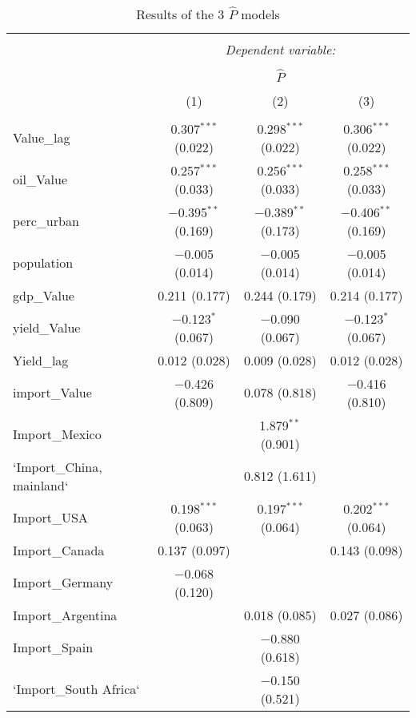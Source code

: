 
\begin{table}[H] \centering 
  \caption{Results of the 3 $\hat{P}$ models} 
  \label{table:table_phat} 
\tiny 
\begin{tabular}{@{\extracolsep{5pt}}lccc} 
\\[-1.8ex]\hline 
\hline \\[-1.8ex] 
 & \multicolumn{3}{c}{\textit{Dependent variable:}} \\ 
\cline{2-4} 
\\[-1.8ex] & \multicolumn{3}{c}{$\hat{P}$} \\ 
\\[-1.8ex] & (1) & (2) & (3)\\ 
\hline \\[-1.8ex] 
 Value\_lag & 0.307$^{***}$ (0.022) & 0.298$^{***}$ (0.022) & 0.306$^{***}$ (0.022) \\ 
  oil\_Value & 0.257$^{***}$ (0.033) & 0.256$^{***}$ (0.033) & 0.258$^{***}$ (0.033) \\ 
  perc\_urban & $-$0.395$^{**}$ (0.169) & $-$0.389$^{**}$ (0.173) & $-$0.406$^{**}$ (0.169) \\ 
  population & $-$0.005 (0.014) & $-$0.005 (0.014) & $-$0.005 (0.014) \\ 
  gdp\_Value & 0.211 (0.177) & 0.244 (0.179) & 0.214 (0.177) \\ 
  yield\_Value & $-$0.123$^{*}$ (0.067) & $-$0.090 (0.067) & $-$0.123$^{*}$ (0.067) \\ 
  Yield\_lag & 0.012 (0.028) & 0.009 (0.028) & 0.012 (0.028) \\ 
  import\_Value & $-$0.426 (0.809) & 0.078 (0.818) & $-$0.416 (0.810) \\ 
  Import\_Mexico &  & 1.879$^{**}$ (0.901) &  \\ 
  `Import\_China, mainland` &  & 0.812 (1.611) &  \\ 
  Import\_USA & 0.198$^{***}$ (0.063) & 0.197$^{***}$ (0.064) & 0.202$^{***}$ (0.064) \\ 
  Import\_Canada & 0.137 (0.097) &  & 0.143 (0.098) \\ 
  Import\_Germany & $-$0.068 (0.120) &  &  \\ 
  Import\_Argentina &  & 0.018 (0.085) & 0.027 (0.086) \\ 
  Import\_Spain &  & $-$0.880 (0.618) &  \\ 
  `Import\_South Africa` &  & $-$0.150 (0.521) &  \\ 

\end{tabular}
\end{table}

